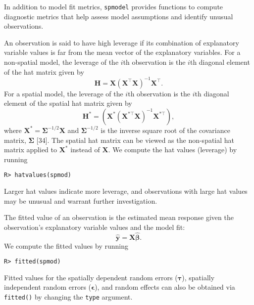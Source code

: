 \documentclass[10pt,letterpaper]{article}
\begin{document}
In addition to model fit metrics, \texttt{spmodel} provides functions to
compute diagnostic metrics that help assess model assumptions and
identify unusual observations.

An observation is said to have high leverage if its combination of
explanatory variable values is far from the mean vector of the
explanatory variables. For a non-spatial model, the leverage of the
\(i\)th observation is the \(i\)th diagonal element of the hat matrix
given by \begin{equation*}
  \mathbf{H} = \mathbf{X}(\mathbf{X}^\top\mathbf{X})^{-1}\mathbf{X}^\top .
\end{equation*} For a spatial model, the leverage of the \(i\)th
observation is the \(i\)th diagonal element of the spatial hat matrix
given by \begin{equation*}
  \mathbf{H}^* = (\mathbf{X}^* (\mathbf{X}^{* \top} \mathbf{X})^{-1} \mathbf{X}^{* \top}) ,
\end{equation*} where
\(\mathbf{X}^* = \boldsymbol{\Sigma}^{-1/2}\mathbf{X}\) and
\(\boldsymbol{\Sigma}^{-1/2}\) is the inverse square root of the
covariance matrix, \(\boldsymbol{\Sigma}\) {[}34{]}. The spatial hat
matrix can be viewed as the non-spatial hat matrix applied to
\(\mathbf{X}^*\) instead of \(\mathbf{X}\). We compute the hat values
(leverage) by running

\begin{verbatim}
R> hatvalues(spmod)
\end{verbatim}

\noindent Larger hat values indicate more leverage, and observations
with large hat values may be unusual and warrant further investigation.

The fitted value of an observation is the estimated mean response given
the observation's explanatory variable values and the model fit:
\begin{equation*}
  \hat{\mathbf{y}} = \mathbf{X} \hat{\boldsymbol{\beta}}.
\end{equation*} We compute the fitted values by running

\begin{verbatim}
R> fitted(spmod)
\end{verbatim}

\noindent Fitted values for the spatially dependent random errors
(\(\boldsymbol{\tau}\)), spatially independent random errors
(\(\boldsymbol{\epsilon}\)), and random effects can also be obtained via
\texttt{fitted()} by changing the \texttt{type} argument.
\end{document}
